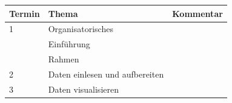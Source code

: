 \documentclass[12pt,]{book}
\begin{document}
\begin{longtable}[]{@{}lll@{}}
\toprule
Termin & Thema & Kommentar\tabularnewline
\midrule
\endhead
\begin{minipage}[t]{0.32\columnwidth}\raggedright\strut
1\strut
\end{minipage} & \begin{minipage}[t]{0.32\columnwidth}\raggedright\strut
Organisatorisches\strut
\end{minipage} & \begin{minipage}[t]{0.32\columnwidth}\raggedright\strut
\strut
\end{minipage}\tabularnewline
\begin{minipage}[t]{0.32\columnwidth}\raggedright\strut
\strut
\end{minipage} & \begin{minipage}[t]{0.32\columnwidth}\raggedright\strut
Einführung\strut
\end{minipage} & \begin{minipage}[t]{0.32\columnwidth}\raggedright\strut
\strut
\end{minipage}\tabularnewline
\begin{minipage}[t]{0.32\columnwidth}\raggedright\strut
\strut
\end{minipage} & \begin{minipage}[t]{0.32\columnwidth}\raggedright\strut
Rahmen\strut
\end{minipage} & \begin{minipage}[t]{0.32\columnwidth}\raggedright\strut
\strut
\end{minipage}\tabularnewline
\begin{minipage}[t]{0.32\columnwidth}\raggedright\strut
2\strut
\end{minipage} & \begin{minipage}[t]{0.32\columnwidth}\raggedright\strut
Daten einlesen und aufbereiten\strut
\end{minipage} & \begin{minipage}[t]{0.32\columnwidth}\raggedright\strut
\strut
\end{minipage}\tabularnewline
\begin{minipage}[t]{0.32\columnwidth}\raggedright\strut
3\strut
\end{minipage} & \begin{minipage}[t]{0.32\columnwidth}\raggedright\strut
Daten visualisieren\strut
\end{minipage} & \begin{minipage}[t]{0.32\columnwidth}\raggedright\strut

\end{minipage}
\end{longtable}
\end{document}
